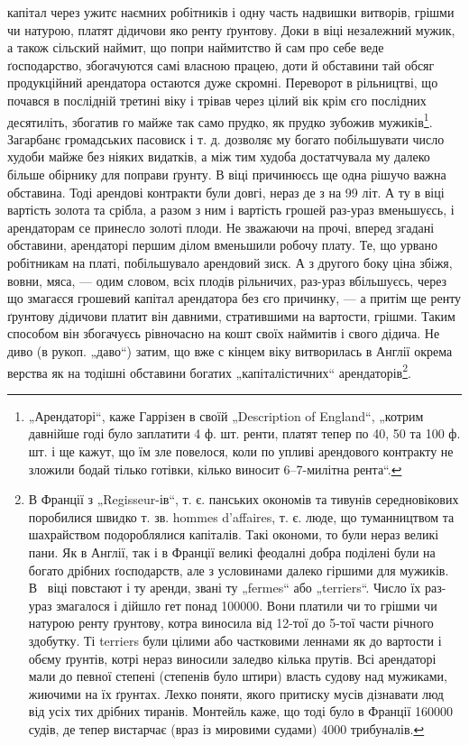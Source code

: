 \parcont{}
капітал через ужитє наємних робітників і одну часть надвишки витворів, грішми чи натурою, платят
дідичови яко ренту ґрунтову. Доки в  віці незалежний мужик, а також сільский наймит, що попри
наймитство й сам про себе веде ґосподарство, збогачуются самі власною працею, доти й обставини тай
обсяг продукційний арендатора остаются дуже скромні. Переворот в рільництві, що почався в послідній
третині  віку і трівав через цілий  вік крім єго послідних десятиліть, збогатив го майже так
само прудко, як прудко зубожив мужиків\footnote{
„Арендаторі“, каже Гаррізен в своїй „Description of England“, „котрим давнійше годі було
заплатити 4 ф. шт. ренти, платят тепер по 40, 50 та 100 ф. шт. і ще кажут, що їм зле повелося, коли
по упливі арендового контракту не зложили бодай тілько готівки, кілько виносит 6--7-милітна рента“.
}. Загарбанє громадських пасовиск і т. д. дозволяє му
богато побільшувати число худоби майже без ніяких видатків, а між тим худоба достатчувала му далеко
більше обірнику для поправи ґрунту. В  віці причинюєсь ще одна рішучо важна обставина. Тоді
арендові контракти були довгі, нераз де з на 99 літ. А ту в  віці вартість золота та срібла, а
разом з ним і вартість грошей раз-ураз вменьшуєсь, і арендаторам се принесло золоті плоди. Не
зважаючи на прочі, вперед згадані обставини, арендаторі першим ділом вменьшили робочу плату. Те, що
урвано робітникам на платі, побільшувало
арендовий зиск. А з другого боку ціна збіжя, вовни, мяса, — одим словом, всіх плодів рільничих,
раз-ураз вбільшуєсь, через що змагаєся грошевий капітал арендатора
без єго причинку, — а притім ще ренту ґрунтову дідичови платит він давними, стратившими на вартости,
грішми. Таким способом він збогачуєсь рівночасно на кошт своїх наймитів і свого дідича. Не диво (в
рукоп. „даво“) затим, що вже с кінцем  віку витворилась в Англії окрема верства як на тодішні
обставини богатих „капіталістичних“ арендаторів\footnote{
В Франції з „Regisseur-ів“, т. є. панських окономів та тивунів середновікових поробилися швидко
т. зв. hommes d'affaires, т. є. люде, що туманництвом та шахрайством подороблялися капіталів. Такі
окономи, то були нераз великі пани. Як в Англії, так і в Франції великі феодалні добра поділені були
на богато дрібних ґосподарств, але з условинами далеко гіршими для мужиків. В~ віці повстают і ту
аренди, звані ту „fermes“ або „terriers“. Число їх раз-ураз змагалося і дійшло гет понад
\num{100000}. Вони платили чи то грішми чи натурою ренту ґрунтову, котра виносила від 12-тої до 5-тої
части річного здобутку. Ті terriers були цілими або частковими леннами як до вартости і обєму
ґрунтів, котрі нераз виносили заледво кілька прутів. Всі арендаторі мали до певної степені (степенів
було штири) власть судову над мужиками, жиючими
на їх ґрунтах. Лехко поняти, якого притиску мусів дізнавати люд від
усіх тих дрібних тиранів. Монтейль каже, що тоді було в Франції \num{160000}
судів, де тепер вистарчає (враз із мировими судами) 4000 трибуналів.
}.
